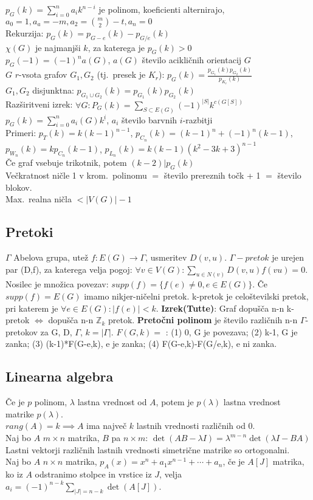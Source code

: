 \documentclass{article}
\theoremstyle{definition}
\begin{document}
$p_G(k) = \sum_{i=0}^n a_i k^{n-i}$ je polinom, koeficienti alternirajo, $a_0 = 1, a_a = -m, a_2 = \binom{m}{2} - t, a_n = 0$\\
Rekurzija: $p_G(k) = p_{G-e}(k) - p_{G/e}(k)$\\
$\chi(G)$ je najmanjši $k$, za katerega je $p_G(k) > 0$\\
$p_G(-1) = (-1)^n a(G)$, $a(G)$ število acikličnih orientacij $G$\\
$G$ $r$-vsota grafov $G_1, G_2$ (tj.\ presek je $K_r$): $p_G(k) = \frac{p_{G_1}(k) p_{G_2}(k)}{p_{K_r}(k)}$\\
$G_1, G_2$ disjunktna: $p_{G_1 \cup G_2}(k) = p_{G_1}(k) p_{G_2}(k)$\\
Razširitveni izrek: $\forall G: P_G(k) = \sum_{S \subset E(G)} (-1)^{|S|} k^{c(G[S])}$\\
$p_G(k) = \sum_{i=0}^n a_i(G) k^{\underline{i}}$, $a_i$ število barvnih $i$-razbitji\\
Primeri: $p_T(k) = k (k-1)^{n-1}$, $p_{C_n}(k) = (k-1)^n + (-1)^n (k-1)$, $p_{W_n}(k) = k p_{C_n} (k-1)$, $p_{L_n}(k) = k (k-1) (k^2 - 3 k + 3)^{n-1}$\\
Če graf vsebuje trikotnik, potem $(k-2)|p_G(k)$\\
Večkratnost ničle 1 v krom.\ polinomu $=$ število prereznih točk + 1 $=$ število blokov.\\
Max.\ realna ničla $< |V(G)| - 1$


\subsection*{Pretoki}
$\Gamma$ Abelova grupa, utež $f \colon E(G) \to \Gamma$, usmeritev $D(v,u)$.
$\Gamma - pretok$ je urejen par (D,f), za katerega velja pogoj: $\forall v \in
V(G): \sum_{u \in N(v)} D(v,u)f(vu) = 0$. Nosilec je množica povezav: $supp(f) =
\{f(e) \neq 0, e \in E(G)\}$. Če $supp(f) = E(G)$ imamo nikjer-ničelni pretok. k-pretok je celoštevilski pretok, pri katerem je $\forall e \in E(G): |f(e)| < k$. \textbf{Izrek(Tutte)}: Graf dopušča n-n k-pretok $\iff$ dopušča n-n $\mathbb{Z}_{k}$ pretok. \textbf{Pretočni polinom} je število različnih n-n $\Gamma$-pretokov za G, D, $\Gamma$, $k=|\Gamma|$. $F(G,k)=$ : (1) 0, G je povezava; (2) k-1, G je zanka; (3) (k-1)*F(G-e,k), e je zanka; (4) F(G-e,k)-F(G/e,k), e ni zanka.

\subsection*{Linearna algebra}
Če je $p$ polinom, $\lambda$ lastna vrednost od $A$, potem je $p(\lambda)$ lastna vrednost matrike $p(\lambda)$.\\
$rang(A) = k \implies A$ ima največ $k$ lastnih vrednosti različnih od $0$.\\
Naj bo $A$ $m \times n$ matrika, $B$ pa $n \times m$: $\det(AB - \lambda I) = \lambda^{m-n} \det(\lambda I - BA)$\\
Lastni vektorji različnih lastnih vrednosti simetrične matrike so ortogonalni.\\
Naj bo $A$ $n\times n$ matrika, $p_A(x) = x^n + a_1 x^{n-1} + \cdots + a_n$, če je $A[J]$ matrika, ko iz $A$ odstranimo stolpce in vrstice iz $J$, velja $a_i = (-1)^{n-k} \sum_{|J| = n-k} \det(A[J])$.
\end{document}
